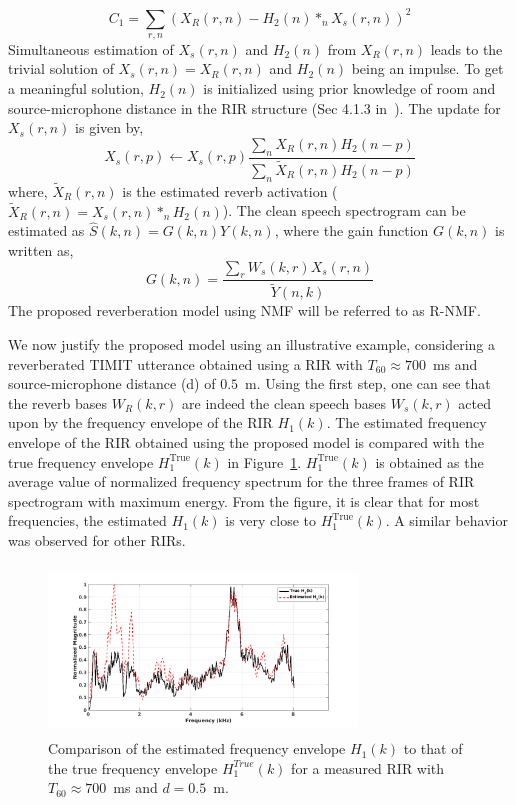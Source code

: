 \begin{equation}
C_1 = \sum_{r,n}( X_R(r,n) - H_2(n) *_n X_s(r,n))^2
\end{equation}
Simultaneous estimation of $X_s(r,n)$ and $H_2(n)$ from $X_R(r,n)$ leads to the trivial solution of $X_s(r,n)=X_R(r,n)$ and $H_2(n)$ being an impulse. To get a meaningful solution, $H_2(n)$ is initialized using prior knowledge of room and source-microphone distance in the RIR structure (Sec 4.1.3 in~\cite{kinoshita2016summary}).
The update for $X_s(r,n)$ is given by,
\begin{equation}
X_s(r,p) \leftarrow X_s(r,p) \dfrac{\sum_n X_R(r,n)H_2(n-p)}{\sum_n\tilde{X}_R(r,n) H_2(n-p)}
\end{equation}
where, $\tilde{X}_R(r,n)$ is the estimated reverb activation ($\tilde{X}_R(r,n) = X_s(r,n)*_nH_2(n)$). The clean speech spectrogram can be estimated as $\hat{S}(k,n)=G(k,n)Y(k,n)$, where the gain function $G(k,n)$ is written as,
\begin{equation}
G(k,n)=\dfrac{\sum_rW_s(k,r)X_s(r,n)}{\tilde{Y}(n,k)}
\end{equation}
The proposed reverberation model using NMF will be referred to as R-NMF. 

We now justify the proposed model using an illustrative example, considering a reverberated TIMIT utterance obtained using a RIR with $T_{60}\approx700$~ms and source-microphone distance (d) of $0.5$~m. Using the first step, one can see that the reverb bases $W_R(k,r)$ are indeed the clean speech bases $W_s(k,r)$ acted upon by the frequency envelope of the RIR $H_1(k)$. The estimated frequency envelope of the RIR obtained using the proposed model is compared with the true frequency envelope $H^{\text{True}}_1(k)$ in Figure~\ref{fig:freqEnv_comp}. $H^{\text{True}}_1(k)$ is obtained as the average value of normalized frequency spectrum for the three frames of RIR spectrogram with maximum energy. From the figure, it is clear that for most frequencies, the estimated $H_1(k)$ is very close to $H^{\text{True}}_1(k)$. A similar behavior was observed for other RIRs. 

\begin{figure}[tbh!]
  \centering
  \includegraphics[width=8.2cm, height=4.5cm]{fig/freqEnv_comparison.png}
  \caption{Comparison of the estimated frequency envelope $H_1(k)$ to that of the true frequency envelope $H^{True}_1(k)$ for a measured RIR with $T_{60}\approx 700$~ms and $d=0.5$~m.}
  \label{fig:freqEnv_comp}
\end{figure}

